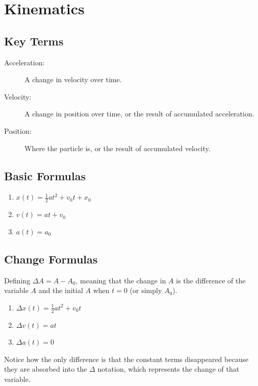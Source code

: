 \documentclass[]{article}
\title{}
\author{}
\begin{document}
\maketitle

\section{Kinematics}
	\subsection{Key Terms}
		\begin{description}
			\item[Acceleration:]
				A change in velocity over time.
			
			\item[Velocity:] 
				A change in position over time, or the result of accumulated acceleration.
			
			\item[Position:]
			 	Where the particle is, or the result of accumulated velocity.
		\end{description}
		
	\subsection{Basic Formulas}
		\begin{enumerate}
			\item $x(t) = \frac{1}{2}at^2 + v_0t+x_0$
			\item $v(t)=at+v_0$
			\item $a(t) = a_0$
		\end{enumerate}	
	
	\subsection{Change Formulas} 
		Defining $\Delta A = A - A_0$, meaning that the change in $A$ is the difference of the variable $A$ and the initial $A$ when $t = 0$ (or simply $A_0$).
			\begin{enumerate}
				\item $\Delta x(t) = \frac{1}{2}at^2 + v_0t$
				\item $\Delta v(t)=at$
				\item $\Delta a(t) = 0$	
			\end{enumerate}
		Notice how the only difference is that the constant terms disappeared because they are absorbed into the $\Delta$ notation, which represents the change of that variable. 
	
\end{document}
